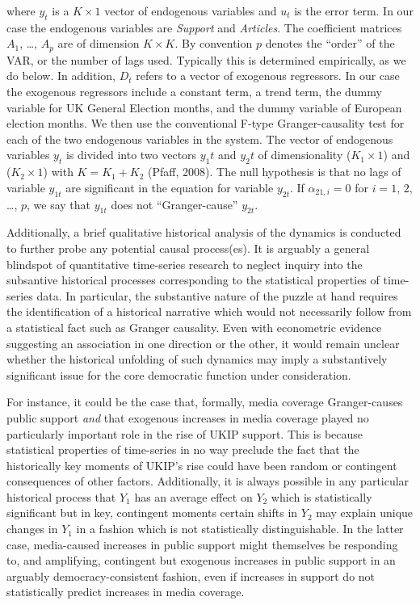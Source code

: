 \documentclass[12pt,article]{article}
\begin{document}
where \(y_t\) is a \(K \times 1\) vector of endogenous variables and
\(u_t\) is the error term. In our case the endogenous variables are
\emph{Support} and \emph{Articles}. The coefficient matrices \(A_1\),
\ldots{}, \(A_p\) are of dimension \(K \times K\). By convention \(p\)
denotes the ``order'' of the VAR, or the number of lags used. Typically
this is determined empirically, as we do below. In addition, \(D_t\)
refers to a vector of exogenous regressors. In our case the exogenous
regressors include a constant term, a trend term, the dummy variable for
UK General Election months, and the dummy variable of European election
months. We then use the conventional F-type Granger-causality test for
each of the two endogenous variables in the system. The vector of
endogenous variables \(y_t\) is divided into two vectors \(y_1t\) and
\(y_2t\) of dimensionality (\(K_1 \times 1\)) and (\(K_2 \times 1\))
with \(K = K_1 + K_2\) (Pfaff, 2008). The null hypothesis is that no
lags of variable \(y_{1t}\) are significant in the equation for variable
\({y}_{2t}\). If \(\alpha_{21, i} = 0\) for \(i = 1\), \(2\), \ldots{},
\(p\), we say that \(y_{1t}\) does not ``Granger-cause'' \(y_{2t}\).

Additionally, a brief qualitative historical analysis of the dynamics is
conducted to further probe any potential causal process(es). It is
arguably a general blindspot of quantitative time-series research to
neglect inquiry into the subsantive historical processes corresponding
to the statistical properties of time-series data. In particular, the
substantive nature of the puzzle at hand requires the identification of
a historical narrative which would not necessarily follow from a
statistical fact such as Granger causality. Even with econometric
evidence suggesting an association in one direction or the other, it
would remain unclear whether the historical unfolding of such dynamics
may imply a substantively significant issue for the core democratic
function under consideration.

For instance, it could be the case that, formally, media coverage
Granger-causes public support \emph{and} that exogenous increases in
media coverage played no particularly important role in the rise of UKIP
support. This is because statistical properties of time-series in no way
preclude the fact that the historically key moments of UKIP's rise could
have been random or contingent consequences of other factors.
Additionally, it is always possible in any particular historical process
that \(Y_1\) has an average effect on \(Y_2\) which is statistically
significant but in key, contingent moments certain shifts in \(Y_2\) may
explain unique changes in \(Y_1\) in a fashion which is not
statistically distinguishable. In the latter case, media-caused
increases in public support might themselves be responding to, and
amplifying, contingent but exogenous increases in public support in an
arguably democracy-consistent fashion, even if increases in support do
not statistically predict increases in media coverage.
\end{document}
